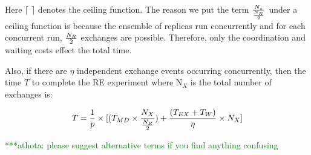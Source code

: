 \documentclass{rspublic}
\newcommand{\jhanote}[1]{ {\textcolor{red} { ***shantenu: #1 }}}
\newcommand{\alnote}[1]{ {\textcolor{blue} { ***andre: #1 }}}
\newcommand{\athotanote}[1]{ {\textcolor{green} { ***athota: #1 }}}
\newcommand{\alnote}[1]{}
\newcommand{\athotanote}[1]{}
\newcommand{\jhanote}[1]{}
\begin{document}
Here $\lceil$ $\rceil$ denotes the ceiling function. The reason we put the term ${N_z \over {N_R \over 2}}$ under a ceiling function is because the ensemble of replicas run concurrently and for each concurrent run, $N_R \over 2$ exchanges are possible. Therefore, only the coordination and waiting costs effect the total time. 

Also, if there are $\eta$ independent exchange events occurring
concurrently, then the time $T$ to complete the RE experiment where N$_X$ is the total number of exchanges is:

\begin{eqnarray}
T = {1\over p} \times [(T_{MD} \times  {N_X \over {N_R \over 2}}) + {(T_{EX} + T_{W}) \over \eta} \times N_X]
\label{eq:totaltime2}
\end{eqnarray}

\athotanote{please suggest alternative terms if you find anything confusing}





\end{document}
